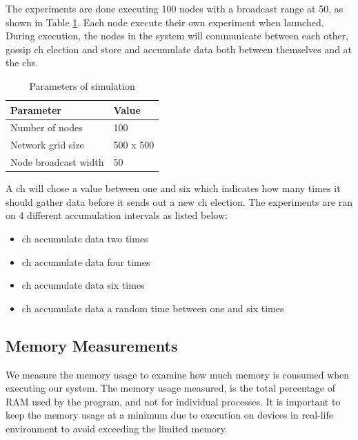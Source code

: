 \documentclass[USenglish]{uit-thesis}
\begin{document}
The experiments are done executing 100 nodes with a broadcast range at 50, as shown in Table \ref{tab:simTable}. Each node execute their own experiment when launched. During execution, the nodes in the system will communicate between each other, gossip \gls{ch} election and store and accumulate data both between themselves and at the \glspl{ch}.

\begin{table} [t]
\centering
\begin{tabular}{|l|l|}
\hline
\textbf{Parameter}       & \textbf{Value} \\ \hline
Number of nodes          & 100            \\ \hline
Network grid size        & 500 x 500      \\ \hline
Node broadcast width     & 50             \\ \hline
\end{tabular}
\caption{Parameters of simulation}
\label{tab:simTable}
\end{table}


A \gls{ch} will chose a value between one and six which indicates how many times it should gather data before it sends out a new \gls{ch} election. The experiments are ran on 4 different accumulation intervals as listed below:

\begin{itemize}
\item \gls{ch} accumulate data two times
\item \gls{ch} accumulate data four times
\item \gls{ch} accumulate data six times
\item \gls{ch} accumulate data a random time between one and six times
\end{itemize}



\subsection{Memory Measurements} \label{eva:mem_measure}
We measure the memory usage to examine how much memory is consumed when executing our system. The memory usage measured, is the total percentage of RAM used by the program, and not for individual processes. It is important to keep the memory usage at a minimum due to execution on devices in real-life environment to avoid exceeding the limited memory.
\end{document}
